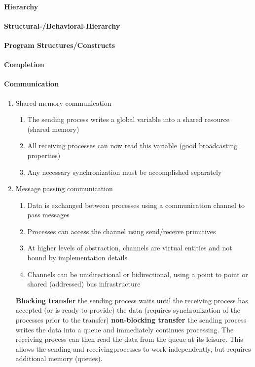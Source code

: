 \documentclass[english]{latex4ei/latex4ei_sheet}
\begin{document}
\paragraph{Hierarchy}

\paragraph{Structural-/Behavioral-Hierarchy}

\paragraph{Program Structures/Constructs}

\paragraph{Completion}

\paragraph{Communication}
\begin{enumerate}
  \item Shared-memory communication
    \begin{enumerate}
      \item The sending process writes a global variable into a shared resource (shared memory)
      \item All receiving processes can now read this variable (good broadcasting properties)
      \item Any necessary synchronization must be accomplished separately
    \end{enumerate}
  \item Message passing communication
    \begin{enumerate}
    	\item Data is exchanged between processes using a communication channel to pass messages
	\item Processes can access the channel using send/receive primitives
	\item At higher levels of abstraction, channels are virtual entities and not bound by implementation details
	\item  Channels can be unidirectional or bidirectional, using a point to point or shared (addressed) bus infrastructure
    \end{enumerate}

    \textbf{Blocking transfer} the sending process waits until the receiving process has accepted (or is ready to provide) the data (requires synchronization of the processes prior to the transfer)
    \textbf{non-blocking transfer} the sending process writes the data into a queue and immediately continues processing. The receiving process can then read the data from the queue at its leisure. This allows the sending and receivingprocesses to work independently, but requires additional memory (queues).
\end{enumerate}
\end{document}
